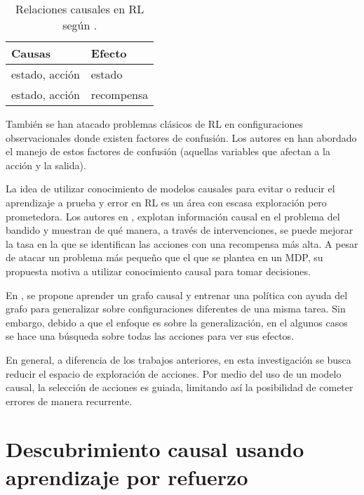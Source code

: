 \begin{table}[h]
\centering
\caption{Relaciones causales en RL según \cite{Gershman2017}.}
\begin{tabular}{@{}ll@{}}
\toprule
Causas         & Efecto     \\ \midrule
estado, acción & estado     \\
estado, acción & recompensa \\ \bottomrule
\end{tabular}
\end{table}

También se han atacado problemas clásicos de RL 
en configuraciones observacionales donde existen factores de confusión. Los autores en \cite{bareinboim2015bandits} \cite{lu2018deconfounding}
han abordado el manejo de estos factores de confusión (aquellas variables que afectan a la acción y la salida).

La idea de utilizar conocimiento de modelos
causales para evitar o reducir el aprendizaje a 
prueba y error en RL es un área con escasa 
exploración pero prometedora.
Los autores en \cite{lattimore2016causal},
explotan información causal en el problema
del bandido y muestran de qué manera, a través
de intervenciones, se puede mejorar la
tasa en la que se identifican las acciones
con una recompensa más alta. A pesar de atacar un problema más pequeño
que el que se plantea en un MDP, su propuesta motiva a utilizar 
conocimiento causal para tomar decisiones.


En \cite{nair2019causal}, se propone
aprender un grafo causal y
entrenar una política con ayuda del grafo para generalizar sobre 
configuraciones diferentes de una misma
tarea.
Sin embargo, debido a que el enfoque es sobre la generalización, en el algunos casos
se hace una búsqueda sobre todas las acciones para ver sus efectos.


En general, a diferencia de los trabajos anteriores,
en esta investigación se busca reducir el espacio de exploración
de acciones. 
Por medio del uso de un modelo causal, la selección de acciones es guiada, limitando así la posibilidad de cometer errores de manera recurrente.

\section{Descubrimiento causal usando aprendizaje por refuerzo}

